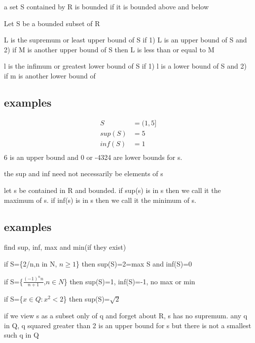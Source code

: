 \documentclass[letterpaper]{article}
\begin{document}
a set S contained by R is bounded if it is bounded above and below

Let S be a bounded subset of R

L is the supremum or least upper bound of S if 1) L is an upper bound of S and 2) if M is another upper bound of S then L is less than or equal to M

l is the infimum or greatest lower bound of S if 1) l is a lower bound of S and 2) if m is another lower bound of 
\subsection*{examples}
\begin{align*}
  S&=(1,5]\\
  sup(S)&=5\\
  inf(S)&=1\\
\end{align*}
6 is an upper bound and 0 or -4324 are lower bounds for s.

the sup and inf need not necessarily be elements of s


let s be contained in R and bounded. if sup(s) is in s then we call it the maximum of s. if inf(s) is in s then we call it the minimum of s.
\subsection*{examples}
find sup, inf, max and min(if they  exist)

if S=\{2/n,n in N, $n\ge 1$\} then sup(S)=2=max S and inf(S)=0

if S=\{$\frac{(-1)^nn}{n+1}$,$n\in N$\} then sup(S)=1, inf(S)=-1, no max or min

if S=\{$x\in Q:x^2<2$\} then sup(S)=$\sqrt{2}$

if we view s as a subset only of q and forget about R, s has no supremum. any q in Q, q squared greater than 2 is an upper bound for s but there is not a smallest such q in Q
\end{document}
